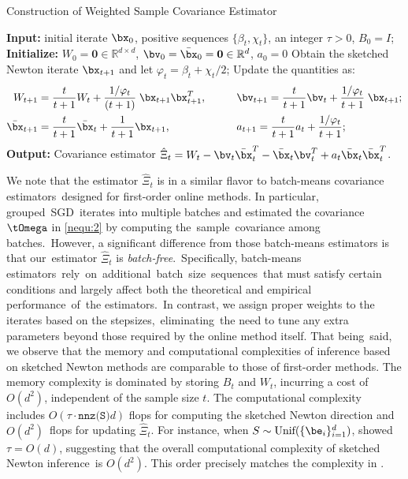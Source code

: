 \begin{algorithm}[!t]
\caption{Construction of Weighted Sample Covariance Estimator}	\label{alg:2}
\begin{algorithmic}[1]
\State\textbf{Input:} initial iterate $\bx_0$, positive sequences $\{\beta_t, \chi_t\}$, an integer $\tau>0$, $B_0 = I$;
\State\textbf{Initialize:} $W_0 = \boldsymbol{0}\in\mathbb{R}^{d\times d}$, $\bv_0 = \bar{\bx}_0 = \boldsymbol{0}\in\mathbb{R}^d$, $a_0 = 0$
\State Obtain the sketched Newton iterate $\bx_{t+1}$ and let $\varphi_t = \beta_t+\chi_t/2$;
\State Update the quantities as:
\begin{align*}
W_{t+1} & = \frac{t}{t+1}W_t + \frac{1/\varphi_t}{(t+1)}\;\bx_{t+1}\bx_{t+1}^T,\quad\quad && \bv_{t+1}  = \frac{t}{t+1}\bv_t + \frac{1/\varphi_t}{t+1}\;\bx_{t+1};\\
\bar{\bx}_{t+1} & = \frac{t}{t+1}\bar{\bx}_t + \frac{1}{t+1}\bx_{t+1},\quad\quad && a_{t+1} = \frac{t}{t+1}a_t + \frac{1/\varphi_t}{t+1};
\end{align*}
\EndFor
\State\textbf{Output:} Covariance estimator $\hat{\Xi}_t = W_t - \bv_t\bar{\bx}_t^T - \bar{\bx}_t\bv_t^T + a_t\bar{\bx}_t\bar{\bx}_t^T$.
\end{algorithmic}
\end{algorithm}


We note that the estimator $\hat{\Xi}_t$ is in a similar flavor to batch-means covariance estimators~designed for first-order online methods. In particular, \cite{Chen2020Statistical, Zhu2021Online} grouped~SGD~iterates into multiple batches and estimated the covariance $\tOmega$ in \eqref{nequ:2} by computing the~\mbox{sample}~\mbox{covariance} among batches.~However, a significant difference from those batch-means estimators is that our~estimator $\hat{\Xi}_t$ is \textit{batch-free}.~Specifically, batch-means estimators~rely~on~\mbox{additional}~batch~size~\mbox{sequences}~that must satisfy certain conditions and largely affect both the theoretical and empirical performance~of~the estimators.~In contrast, we assign proper weights to the iterates based on the \mbox{stepsizes},~\mbox{eliminating}~the need to tune any extra parameters beyond those required by the online method itself. That \mbox{being}~said, 
we observe that the memory and computational complexities of inference based on sketched Newton methods are comparable to those of first-order methods. The memory complexity is dominated by storing $B_t$ and $W_t$, incurring a cost of $O(d^2)$, independent of the sample size $t$. The computational complexity includes $O(\tau\cdot\texttt{nnz(S)}d)$ flops for computing the sketched Newton direction and $O(d^2)$~flops for updating $\hat{\Xi}_t$. For instance, when $S\sim \text{Unif}(\{\be_i\}_{i=1}^d)$, \cite{Na2022Statistical} showed~$\tau = O(d)$, suggesting that the overall computational complexity of sketched Newton inference~is $O(d^2)$. This order precisely matches the complexity in \cite{Chen2020Statistical, Zhu2021Online}.


